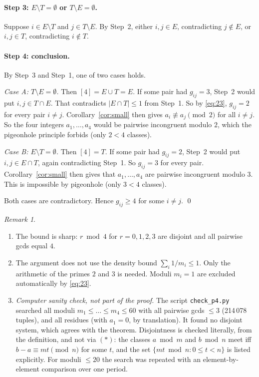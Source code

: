 \documentclass[11pt]{article}
\theoremstyle{remark}
\newtheorem{remark}[theorem]{Remark}
\theoremstyle{definition}
\begin{document}
\paragraph{Step 3: $E\setminus T=\emptyset$ or $T\setminus E=\emptyset$.}
Suppose $i\in E\setminus T$ and $j\in T\setminus E$. By Step~2, either $i,j\in E$, contradicting
$j\notin E$, or $i,j\in T$, contradicting $i\notin T$.

\paragraph{Step 4: conclusion.}
By Step~3 and Step~1, one of two cases holds.

\emph{Case A: $T\setminus E=\emptyset$.} Then $[4]=E\cup T=E$. If some pair had $g_{ij}=3$, Step~2
would put $i,j\in T\cap E$. That contradicts $|E\cap T|\le1$ from Step~1. So by \eqref{eq:23},
$g_{ij}=2$ for every pair $i\ne j$. Corollary~\ref{cor:small} then gives $a_i\not\equiv a_j\pmod2$
for all $i\ne j$. So the four integers $a_1,\dots,a_4$ would be pairwise incongruent modulo $2$,
which the pigeonhole principle forbids (only $2<4$ classes).

\emph{Case B: $E\setminus T=\emptyset$.} Then $[4]=T$. If some pair had $g_{ij}=2$, Step~2 would put
$i,j\in E\cap T$, again contradicting Step~1. So $g_{ij}=3$ for every pair. Corollary~\ref{cor:small}
then gives that $a_1,\dots,a_4$ are pairwise incongruent modulo $3$. This is impossible by
pigeonhole (only $3<4$ classes).

Both cases are contradictory. Hence $g_{ij}\ge4$ for some $i\ne j$. \qed

\begin{remark}
\begin{enumerate}
\item The bound is sharp: $r\bmod4$ for $r=0,1,2,3$ are disjoint and all pairwise gcds equal $4$.
\item The argument does not use the density bound $\sum_i 1/m_i\le1$. Only the arithmetic of
  the primes $2$ and $3$ is needed. Moduli $m_i=1$ are excluded automatically by \eqref{eq:23}.
\item \emph{Computer sanity check, not part of the proof.} The script \texttt{check\_p4.py} searched
  all moduli $m_1\le\dots\le m_4\le60$ with all pairwise gcds $\le3$ (214\,078 tuples), and all
  residues (with $a_1=0$, by translation). It found no disjoint system, which agrees with the theorem.
  Disjointness is checked literally, from the definition, and not via $(*)$: the classes $a\bmod m$
  and $b\bmod n$ meet iff $b-a\equiv mt\pmod n$ for some $t$, and the set $\{mt\bmod n:0\le t<n\}$ is
  listed explicitly. For moduli $\le20$ the search was repeated with an element-by-element
  comparison over one period.
\end{enumerate}
\end{remark}
\end{document}
